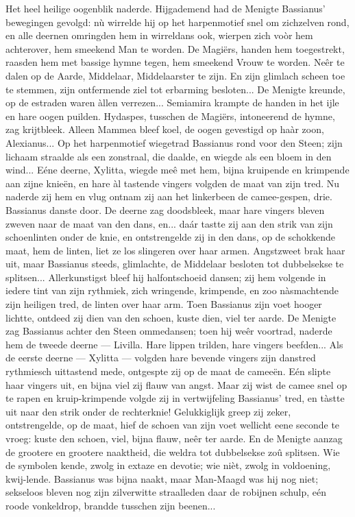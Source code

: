 \documentclass[a4paper, 12pt, oneside, dutch]{article}
\begin{document}
Het heel heilige oogenblik naderde. Hijgademend had de Menigte Bassianus' bewegingen gevolgd: nù wirrelde hij op het harpenmotief snel om zichzelven rond, en alle deernen omringden hem in wirreldans ook, wierpen zich voòr hem achterover, hem smeekend Man te worden. De Magiërs, handen hem toegestrekt, raasden hem met bassige hymne tegen, hem smeekend Vrouw te worden. Neêr te dalen op de Aarde, Middelaar, Middelaarster te zijn. En zijn glimlach scheen toe te stemmen, zijn ontfermende ziel tot erbarming besloten... De Menigte kreunde, op de estraden waren àllen verrezen... Semiamira krampte de handen in het ijle en hare oogen puilden. Hydaspes, tusschen de Magiërs, intoneerend de hymne, zag krijtbleek. Alleen Mammea bleef koel, de oogen gevestigd op haàr zoon, Alexianus... Op het harpenmotief wiegetrad Bassianus rond voor den Steen; zijn lichaam straalde als een zonstraal, die daalde, en wiegde als een bloem in den wind... Eéne deerne, Xylitta, wiegde meê met hem, bijna kruipende en krimpende aan zijne knieën, en hare àl tastende vingers volgden de maat van zijn tred. Nu naderde zij hem en vlug ontnam zij aan het linkerbeen de camee-gespen, drie. Bassianus danste door. De deerne zag doodsbleek, maar hare vingers bleven zweven naar de maat van den dans, en... daár tastte zij aan den strik van zijn schoenlinten onder de knie, en ontstrengelde zij in den dans, op de schokkende maat, hem de linten, liet ze los slingeren over haar armen. Angstzweet brak haar uit, maar Bassianus steeds, glimlachte, de Middelaar besloten tot dubbelsekse te splitsen... Allerkunstigst bleef hij halfontschoeid dansen; zij hem volgende in iedere tint van zijn rythmiek, zich wringende, krimpende, en zoo nàsmachtende zijn heiligen tred, de linten over haar arm. Toen Bassianus zijn voet hooger lichtte, ontdeed zij dien van den schoen, kuste dien, viel ter aarde. De Menigte zag Bassianus achter den Steen ommedansen; toen hij weêr voortrad, naderde hem de tweede deerne --- Livilla. Hare lippen trilden, hare vingers beefden... Als de eerste deerne --- Xylitta --- volgden hare bevende vingers zijn danstred rythmiesch uittastend mede, ontgespte zij op de maat de cameeën. Eén slipte haar vingers uit, en bijna viel zij flauw van angst. Maar zij wist de camee snel op te rapen en kruip-krimpende volgde zij in vertwijfeling Bassianus' tred, en tàstte uit naar den strik onder de rechterknie! Gelukkiglijk greep zij zeker, ontstrengelde, op de maat, hief de schoen van zijn voet wellicht eene seconde te vroeg: kuste den schoen, viel, bijna flauw, neêr ter aarde. En de Menigte aanzag de grootere en grootere naaktheid, die weldra tot dubbelsekse zoû splitsen. Wie de symbolen kende, zwolg in extaze en devotie; wie nièt, zwolg in voldoening, kwij-lende. Bassianus was bijna naakt, maar Man-Maagd was hij nog niet; sekseloos bleven nog zijn zilverwitte straalleden daar de robijnen schulp, eén roode vonkeldrop, brandde tusschen zijn beenen...
\end{document}
